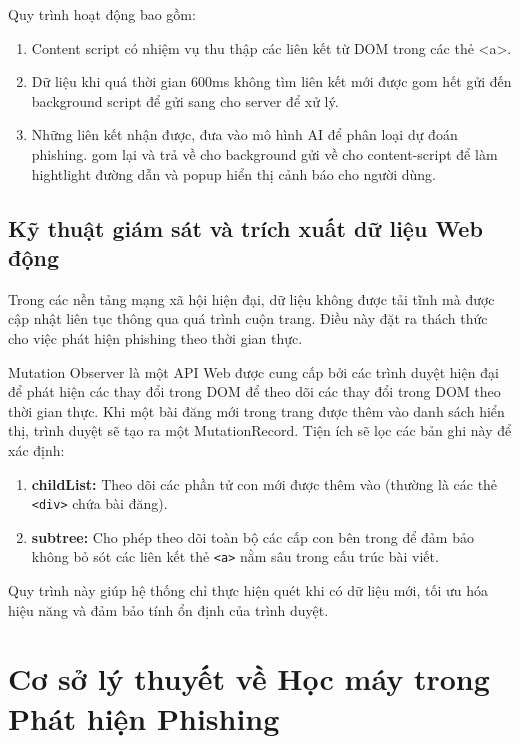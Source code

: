 Quy trình hoạt động bao gồm:
\begin{enumerate}
    \item Content script có nhiệm vụ thu thập các liên kết từ DOM trong các thẻ <a>.
    \item Dữ liệu khi quá thời gian 600ms không tìm liên kết mới được gom hết gửi đến background script để gửi sang cho server để xử lý.
    \item Những liên kết nhận được, đưa vào mô hình AI để phân loại dự đoán phishing. gom lại và trả về cho background gửi về cho content-script để làm hightlight đường dẫn và popup hiển thị cảnh báo cho người dùng.
\end{enumerate}


\subsection{Kỹ thuật giám sát và trích xuất dữ liệu Web động}
\label{sec:dynamic-web-extraction}

Trong các nền tảng mạng xã hội hiện đại, dữ liệu không được tải tĩnh mà được cập nhật liên tục thông qua quá trình cuộn trang. Điều này đặt ra thách thức cho việc phát hiện phishing theo thời gian thực.

 Mutation Observer là một API Web được cung cấp bởi các trình duyệt hiện đại để phát hiện các thay đổi trong DOM để theo dõi các thay đổi trong DOM theo thời gian thực. Khi một bài đăng mới trong trang được thêm vào danh sách hiển thị, trình duyệt sẽ tạo ra một MutationRecord. Tiện ích sẽ lọc các bản ghi này để xác định:
\begin{enumerate}
    \item \textbf{childList:} Theo dõi các phần tử con mới được thêm vào (thường là các thẻ \texttt{<div>} chứa bài đăng).
    \item \textbf{subtree:} Cho phép theo dõi toàn bộ các cấp con bên trong để đảm bảo không bỏ sót các liên kết thẻ \texttt{<a>} nằm sâu trong cấu trúc bài viết.
\end{enumerate}
Quy trình này giúp hệ thống chỉ thực hiện quét khi có dữ liệu mới, tối ưu hóa hiệu năng và đảm bảo tính ổn định của trình duyệt.


\section{Cơ sở lý thuyết về Học máy trong Phát hiện Phishing}
\label{sec:classification-mechanism}

